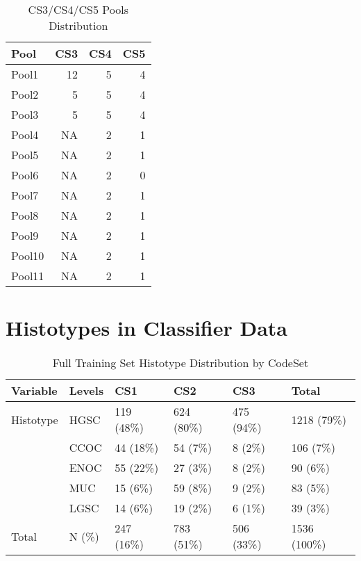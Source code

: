 \documentclass[
]{report}
\begin{document}
\begin{table}

\caption{\label{tab:cs345-pools}CS3/CS4/CS5 Pools Distribution}
\centering
\begin{tabular}[t]{l|r|r|r}
\hline
Pool & CS3 & CS4 & CS5\\
\hline
Pool1 & 12 & 5 & 4\\
\hline
Pool2 & 5 & 5 & 4\\
\hline
Pool3 & 5 & 5 & 4\\
\hline
Pool4 & NA & 2 & 1\\
\hline
Pool5 & NA & 2 & 1\\
\hline
Pool6 & NA & 2 & 0\\
\hline
Pool7 & NA & 2 & 1\\
\hline
Pool8 & NA & 2 & 1\\
\hline
Pool9 & NA & 2 & 1\\
\hline
Pool10 & NA & 2 & 1\\
\hline
Pool11 & NA & 2 & 1\\
\hline
\end{tabular}
\end{table}

\hypertarget{histotypes-in-classifier-data}{%
\section{Histotypes in Classifier Data}\label{histotypes-in-classifier-data}}

\begin{table}

\caption{\label{tab:train-hist-codeset}Full Training Set Histotype Distribution by CodeSet}
\centering
\begin{tabular}[t]{l|l|l|l|l|l}
\hline
Variable & Levels & CS1 & CS2 & CS3 & Total\\
\hline
Histotype & HGSC & 119 (48\%) & 624 (80\%) & 475 (94\%) & 1218 (79\%)\\
\hline
 & CCOC & 44 (18\%) & 54 (7\%) & 8 (2\%) & 106 (7\%)\\
\hline
 & ENOC & 55 (22\%) & 27 (3\%) & 8 (2\%) & 90 (6\%)\\
\hline
 & MUC & 15 (6\%) & 59 (8\%) & 9 (2\%) & 83 (5\%)\\
\hline
 & LGSC & 14 (6\%) & 19 (2\%) & 6 (1\%) & 39 (3\%)\\
\hline
Total & N (\%) & 247 (16\%) & 783 (51\%) & 506 (33\%) & 1536 (100\%)\\
\hline
\end{tabular}
\end{table}
\end{document}
